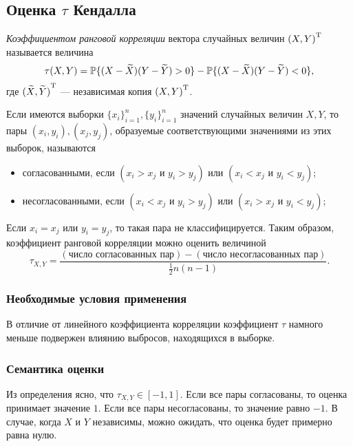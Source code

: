 \subsection*{Оценка $\tau$ Кендалла}

\begin{define}
\emph{Коэффициентом ранговой корреляции} вектора случайных величин $\trans{(X, Y)}$ называется величина
\begin{equation}
	\tau(X, Y) = \P\{(X - \widetilde{X})(Y - \widetilde{Y}) > 0\} - \P\{(X - \widetilde{X})(Y - \widetilde{Y}) < 0\},
\end{equation}
где $\trans{(\widetilde{X}, \widetilde{Y})}$ --- независимая копия $\trans{(X, Y)}$.
\end{define}

Если имеются выборки $\{x_i\}_{i=1}^n, \{y_i\}_{i=1}^n$ значений случайных величин $X, Y$, то пары $(x_i, y_i), (x_j, y_j)$, образуемые соответствующими значениями из этих выборок, называются
\begin{itemize}
	\item согласованными, если $(x_i > x_j \text{ и } y_i > y_j) \text{ или } (x_i < x_j \text{ и } y_i < y_j)$;
	\item несогласованными, если $(x_i < x_j \text{ и } y_i > y_j) \text{ или } (x_i > x_j \text{ и } y_i < y_j)$;
\end{itemize}
Если $x_i = x_j \text{ или } y_i = y_j$, то такая пара не классифицируется. Таким образом, коэффициент ранговой корреляции можно оценить величиной
\begin{equation}
\tau_{X, Y} = \frac{(\text{число согласованных пар}) - (\text{число несогласованных пар})}{\frac{1}{2}n(n - 1)}.
\end{equation}

\subsubsection*{Необходимые условия применения}
В отличие от линейного коэффициента корреляции коэффициент $\tau$ намного меньше подвержен влиянию выбросов, находящихся в выборке.
\subsubsection*{Семантика оценки}
Из определения ясно, что $\tau_{X, Y} \in [-1, 1]$. Если все пары согласованы, то оценка принимает значение $1$. Если все пары несогласованы, то значение равно $-1$. В случае, когда $X$ и $Y$ независимы, можно ожидать, что оценка будет примерно равна нулю.

